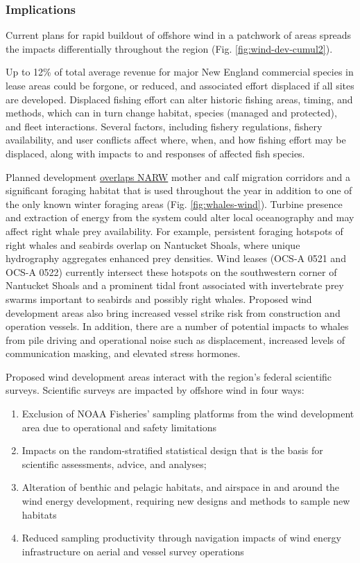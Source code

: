 \documentclass[
  10pt,
]{article}
\providecommand{\tightlist}{%
  \setlength{\itemsep}{0pt}\setlength{\parskip}{0pt}}
\begin{document}
\hypertarget{implications-6}{%
\subsubsection{Implications}\label{implications-6}}

Current plans for rapid buildout of offshore wind in a patchwork of areas spreads the impacts differentially throughout the region (Fig. \ref{fig:wind-dev-cumul2}).

Up to 12\% of total average revenue for major New England commercial species in lease areas could be forgone, or reduced, and associated effort displaced if all sites are developed. Displaced fishing effort can alter historic fishing areas, timing, and methods, which can in turn change habitat, species (managed and protected), and fleet interactions. Several factors, including fishery regulations, fishery availability, and user conflicts affect where, when, and how fishing effort may be displaced, along with impacts to and responses of affected fish species.

Planned development \href{https://noaa-edab.github.io/catalog/persistent_hotspots.html}{overlaps NARW} mother and calf migration corridors and a significant foraging habitat that is used throughout the year in addition to one of the only known winter foraging areas (Fig. \ref{fig:whales-wind}). Turbine presence and extraction of energy from the system could alter local oceanography and may affect right whale prey availability. For example, persistent foraging hotspots of right whales and seabirds overlap on Nantucket Shoals, where unique hydrography aggregates enhanced prey densities. Wind leases (OCS-A 0521 and OCS-A 0522) currently intersect these hotspots on the southwestern corner of Nantucket Shoals and a prominent tidal front associated with invertebrate prey swarms important to seabirds and possibly right whales. Proposed wind development areas also bring increased vessel strike risk from construction and operation vessels. In addition, there are a number of potential impacts to whales from pile driving and operational noise such as displacement, increased levels of communication masking, and elevated stress hormones.

Proposed wind development areas interact with the region's federal scientific surveys. Scientific surveys are impacted by offshore wind in four ways:

\begin{enumerate}
\def\labelenumi{\arabic{enumi}.}
\tightlist
\item
  Exclusion of NOAA Fisheries' sampling platforms from the wind development area due to operational and safety limitations
\item
  Impacts on the random-stratified statistical design that is the basis for scientific assessments, advice, and analyses;
\item
  Alteration of benthic and pelagic habitats, and airspace in and around the wind energy development, requiring new designs and methods to sample new habitats
\item
  Reduced sampling productivity through navigation impacts of wind energy infrastructure on aerial and vessel survey operations
\end{enumerate}
\end{document}
